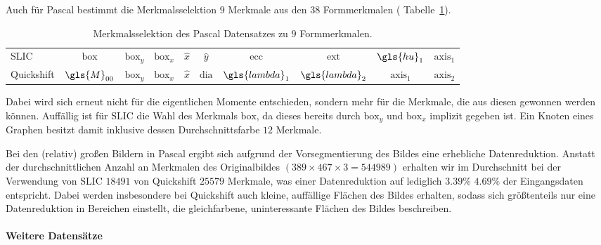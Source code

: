 Auch für \gls{Pascal} bestimmt die Merkmalsselektion $9$ Merkmale aus den $38$ Formmerkmalen (\vgl{} Tabelle~\ref{tab:pascal_voc_merkmale}).
\begin{table}[t]
\centering
\begin{tabular}{lccccccccc}
  \toprule
  \gls{SLIC} & $\mathrm{box}$ & $\mathrm{box}_y$ & $\mathrm{box}_x$ & $\hat x$ & $\hat y$ & $\mathrm{ecc}$ & $\mathrm{ext}$ & $\gls{hu}_1$ & $\mathrm{axis}_1$\\
  Quickshift & $\gls{M}_{00}$ & $\mathrm{box}_y$ & $\mathrm{box}_x$ & $\hat x$ & $\mathrm{dia}$ & $\gls{lambda}_1$ & $\gls{lambda}_2$ & $\mathrm{axis}_1$ & $\mathrm{axis}_2$\\
  \bottomrule
\end{tabular}
  \caption[\gls{Pascal} Merkmalsselektion]{Merkmalsselektion des \gls{Pascal} Datensatzes zu $9$ Formmerkmalen.}
\label{tab:pascal_voc_merkmale}
\end{table}
Dabei wird sich erneut nicht für die eigentlichen Momente entschieden, sondern mehr für die Merkmale, die aus diesen gewonnen werden können.
Auffällig ist für \gls{SLIC} die Wahl des Merkmals $\mathrm{box}$, da dieses bereits durch $\mathrm{box}_y$ und $\mathrm{box}_x$ implizit gegeben ist.
Ein Knoten eines Graphen besitzt damit inklusive dessen Durchschnittsfarbe $12$ Merkmale.

Bei den (relativ) großen Bildern in \gls{Pascal} ergibt sich aufgrund der Vorsegmentierung des Bildes eine erhebliche Datenreduktion.
Anstatt der durchschnittlichen Anzahl an Merkmalen des Originalbildes $\left(389 \times 467 \times 3 = 544989\right)$ erhalten wir im Durchschnitt bei der Verwendung von \gls{SLIC} $18491$ \bzw{} von Quickshift $25579$ Merkmale, was einer Datenreduktion auf lediglich $3.39\%$ \bzw{} $4.69\%$ der Eingangsdaten entspricht.
Dabei werden insbesondere bei Quickshift auch kleine, auffällige Flächen des Bildes erhalten, sodass sich größtenteils nur eine Datenreduktion in Bereichen einstellt, die gleichfarbene, uninteressante Flächen des Bildes beschreiben.

\paragraph{Weitere Datensätze}
\label{weitere_datensaetze}

